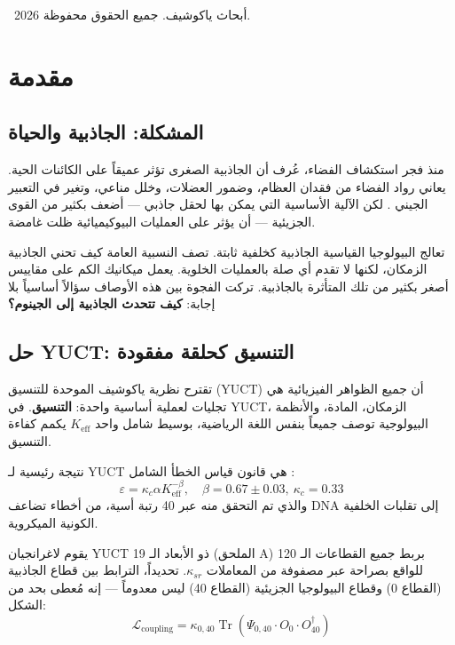 \documentclass[11pt,a4paper]{article}
\newcommand{\Keff}{K_{\mathrm{eff}}}
\newcommand{\kappac}{\kappa_c}
\newcommand{\eps}{\varepsilon}
\theoremstyle{remark}
\begin{document}
	\vspace{0.5cm}
	\noindent
	\textcopyright\ 2026 أبحاث ياكوشيف. جميع الحقوق محفوظة.
	
	\tableofcontents
	\newpage
	
	\section{مقدمة}
	\label{sec:intro}
	
	\subsection{المشكلة: الجاذبية والحياة}
	
	منذ فجر استكشاف الفضاء، عُرف أن الجاذبية الصغرى تؤثر عميقاً على الكائنات الحية. يعاني رواد الفضاء من فقدان العظام، وضمور العضلات، وخلل مناعي، وتغير في التعبير الجيني \cite{NASA-GeneLab, SpaceX-2023}. لكن الآلية الأساسية التي يمكن بها لحقل جاذبي — أضعف بكثير من القوى الجزيئية — أن يؤثر على العمليات البيوكيميائية ظلت غامضة.
	
	تعالج البيولوجيا القياسية الجاذبية كخلفية ثابتة. تصف النسبية العامة كيف تحني الجاذبية الزمكان، لكنها لا تقدم أي صلة بالعمليات الخلوية. يعمل ميكانيك الكم على مقاييس أصغر بكثير من تلك المتأثرة بالجاذبية. تركت الفجوة بين هذه الأوصاف سؤالاً أساسياً بلا إجابة: \textbf{كيف تتحدث الجاذبية إلى الجينوم؟}
	
	\subsection{حل YUCT: التنسيق كحلقة مفقودة}
	
	تقترح نظرية ياكوشيف الموحدة للتنسيق (YUCT) أن جميع الظواهر الفيزيائية هي تجليات لعملية أساسية واحدة: \textbf{التنسيق}. في YUCT، الزمكان، المادة، والأنظمة البيولوجية توصف جميعاً بنفس اللغة الرياضية، بوسيط شامل واحد \(\Keff\) يكمم كفاءة التنسيق.
	
	نتيجة رئيسية لـ YUCT هي قانون قياس الخطأ الشامل \cite{AppendixL}:
	\begin{equation}
		\eps = \kappac \alpha \Keff^{-\beta}, \quad \beta = 0.67 \pm 0.03,\ \kappac = 0.33
		\label{eq:universal-scaling}
	\end{equation}
	والذي تم التحقق منه عبر 40 رتبة أسية، من أخطاء تضاعف DNA إلى تقلبات الخلفية الكونية الميكروية.
	
	يقوم لاغرانجيان YUCT ذو الأبعاد الـ 19 (الملحق A) بربط جميع القطاعات الـ 120 للواقع بصراحة عبر مصفوفة من المعاملات \(\kappa_{sr}\). تحديداً، الترابط بين قطاع الجاذبية (القطاع 0) وقطاع البيولوجيا الجزيئية (القطاع 40) ليس معدوماً — إنه مُعطى بحد من الشكل:
	\begin{equation}
		\mathcal{L}_{\text{coupling}} = \kappa_{0,40} \operatorname{Tr}(\Psi_{0,40} \cdot O_0 \cdot O_{40}^\dagger)
		\label{eq:coupling-general}
	\end{equation}
	
\end{document}
